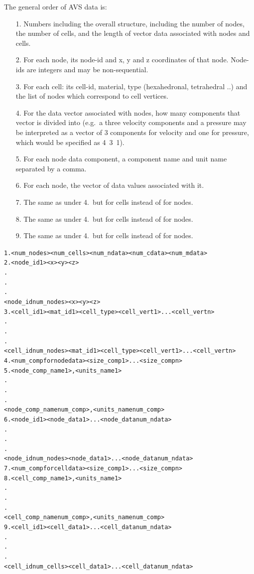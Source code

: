 \documentclass[10pt]{article}
\begin{document}
    The general order of AVS data is:
    \begin{itemize}
    \item[1.] Numbers including the overall structure, including 
              the number of nodes, the number of cells, and the
              length of vector data associated with nodes and
              cells.
    \item[2.] For each node, its node-id and x, y and z coordinates of
              that node. Node-ids are integers and may be non-sequential.
    \item[3.] For each cell: its cell-id, material, type (hexahedronal,
              tetrahedral ..) and the list of nodes which correspond to
              cell vertices.
    \item[4.] For the data vector associated with nodes, how many
              components that vector is divided into (e.g.\ a three 
              velocity components and a pressure may be interpreted
              as a vector of 3 components for velocity and one for
              pressure, which would be specified as \mbox{4 3 1}).
    \item[5.] For each node data component, a component name and
              unit name separated by a comma.
    \item[6.] For each node, the vector of data values associated
              with it.
    \item[7.] The same as under 4.\, but for cells instead of for
              nodes.          
    \item[8.] The same as under 4.\, but for cells instead of for
              nodes.          
    \item[9.] The same as under 4.\, but for cells instead of for
              nodes.          
    \end{itemize}

    \small
    \begin{alltt}
    1. <num_nodes> <num_cells> <num_ndata> <num_cdata> <num_mdata>
    2. <node_id 1> <x> <y> <z>
         .
         .
         .
       <node_id num_nodes> <x> <y> <z>
    3. <cell_id 1> <mat_id 1> <cell_type> <cell_vert 1> ... <cell_vert n>
         .
         .
         .
       <cell_id num_nodes> <mat_id 1> <cell_type> <cell_vert 1> ... <cell_vert n>
    4. <num_comp for node data> <size_comp 1> ... <size_comp n>
    5. <node_comp_name 1>, <units_name 1>
         .
         .
         .
       <node_comp_name num_comp>, <units_name num_comp>
    6. <node_id 1> <node_data 1> ... <node_data num_ndata>
         .
         .
         .
       <node_id num_nodes> <node_data 1> ... <node_data num_ndata>
    7. <num_comp for cell data> <size_comp 1> ... <size_comp n>
    8. <cell_comp_name 1>, <units_name 1>
         .
         .
         .
       <cell_comp_name num_comp>, <units_name num_comp>
    9. <cell_id 1> <cell_data 1> ... <cell_data num_ndata>
         .
         .
         .
       <cell_id num_cells> <cell_data 1> ... <cell_data num_ndata>
    \end{alltt}
    \normalsize 

    
\end{document}
